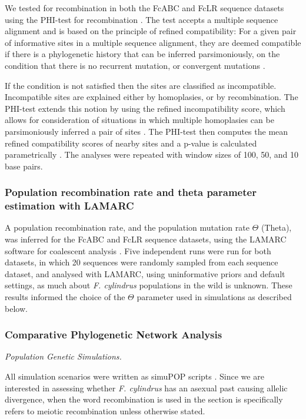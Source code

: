 We tested for recombination in both the FcABC and FcLR sequence datasets using the PHI-test for recombination \parencite{Bruen2006}.
The test accepts a multiple sequence alignment and is based on the principle of refined compatibility: For a given pair of informative sites in a multiple sequence alignment, they are deemed compatible if there is a phylogenetic history that can be inferred parsimoniously, on the condition that there is no recurrent mutation, or convergent mutations \parencite{LeQuesne1969}. 

If the condition is not satisfied then the sites are classified as incompatible.
Incompatible sites are explained either by homoplasies, or by recombination.
The PHI-test extends this notion by using the refined incompatibility score, which allows for consideration of situations in which multiple homoplasies can be parsimoniously inferred a pair of sites \parencite{Bruen2006}.
The PHI-test then computes the mean refined compatibility scores of nearby sites and a p-value is calculated parametrically \parencite{Bruen2006}. The analyses were repeated with window sizes of 100, 50, and 10 base pairs.


\subsubsection{Population recombination rate and theta parameter estimation with LAMARC}

A population recombination rate, and the population mutation rate $\Theta$ (Theta), was inferred for the FcABC and FcLR sequence datasets, using the LAMARC software for coalescent analysis \parencite{Kuhner2006a}.
Five independent runs were run for both datasets, in which 20 sequences were randomly sampled from each sequence dataset, and analysed with LAMARC, using uninformative priors and default settings, as much about \textit{F. cylindrus} populations in the wild is unknown.
These results informed the choice of the $\Theta$ parameter used in simulations as described below.


\subsubsection{Comparative Phylogenetic Network Analysis}

\textit{Population Genetic Simulations.}

All simulation scenarios were written as simuPOP scripts \parencite{Peng2005}.
Since we are interested in assessing whether \textit{F. cylindrus} has an asexual past causing allelic divergence, when the word recombination is used in the section is specifically refers to meiotic recombination unless otherwise stated.

